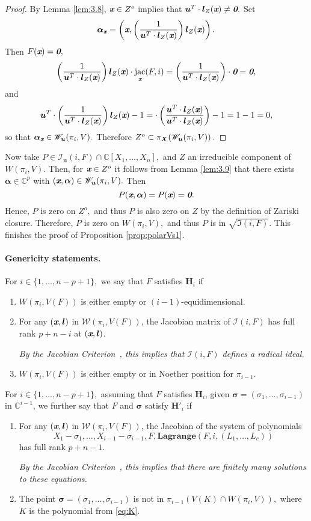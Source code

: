 \documentclass[a4paper]{article}
\def\bz{\textit{\textbf{0}}}
\def\Xb{\textit{\textbf{X}}}
\def\ub{{\bm u}}
\def\lb{{\bm l}}
\def\ax{\bm \alpha_{\xb}}
\def\xb{\textit{\textbf{x}}}
\DeclareMathOperator{\jac}{jac}
\def\C{\mathbb{C}}
\def\Wi{W(\pi_i,V)}
\def\Iir{\sqrt{\mathfrak{I}(i,F)}}
\def\ji{\jac_{\xb}(F,i)}
\def\lagF{{\bm{Lagrange}}(F,i,(L_1,\hdots,L_c))}
\def\Iil{\mathscr{I}_{\ub}(i,F)}
\def\Wil{\mathscr{W}_{\ub}(\pi_i,V)}
\begin{document}
%
\begin{proof}
By Lemma \ref{lem:3.8}, $\xb \in Z^o$ implies that $\ub^T \cdot \lb_{Z}(\xb) \not = \bz.$ Set
\[
\bm \alpha_{\xb} = \left(\xb,\left(\frac{1}{\ub^T\cdot \lb_{Z}(\xb)}\right)\lb_{Z}(\xb)\right). 
\]
Then $F(\xb)=\bz,$
\begin{align*}
    \left(\frac{1}{\ub^T\cdot \lb_{Z}(\xb)}\right)\lb_{Z}(\xb)\cdot \ji = \left(\frac{1}{\ub^T\cdot \lb_{Z}(\xb)}\right)\cdot \bz = \bz,
\end{align*}
and
\[
\ub^T\cdot\left(\frac{1}{\ub^T\cdot \lb_{Z}(\xb)}\right)\lb_{Z}(\xb)-1 =
    \cdot\left(\frac{\ub^T\cdot\lb_{Z}(\xb)}{\ub^T\cdot \lb_{Z}(\xb)}\right)-1=1-1=0,
\]
so that $\ax \in \Wil.$ Therefore $Z^o \subset \pi_{\Xb}\left(\Wil\right).$
%
\end{proof}
%
%
%
\noindent 
Now take $P \in \Iil\cap \C[X_1,\hdots,X_n],$ and $Z$ an irreducible component of $\Wi.$ Then, for $\xb \in Z^o$ it follows from Lemma \ref{lem:3.9} that there exists $\bm \alpha \in \C^p$ with $(\xb, \bm \alpha) \in \Wil.$ Then 
\[
P(\xb, \bm \alpha) = P(\xb) = \bz.
\]
Hence, $P$ is zero on $Z^o,$ and thus $P$ is also zero on $Z$ by the definition of Zariski closure. Therefore, $P$ is zero on $\Wi,$ and thus $P$ is in $\Iir.$ This finishes the proof of Proposition \ref{prop:polarVs1}. 

\noindent
\paragraph*{Genericity statements.}
For $i \in \{1,\hdots,n-p+1\},$ we say that $F$ satisfies $\textbf{H}_i$ if
%
%
\begin{enumerate}
\item  $W(\pi_i,V(F))$ is either empty or $(i-1)$-equidimensional.
\item For any $(\xb,\lb)$ in $\mathscr{W}(\pi_i,V(F))$, the Jacobian matrix of $\mathscr{I}(i,F)$ has full rank $p+n-i$ at $(\xb,\lb)$.  

{\em By the Jacobian Criterion~\cite[Corollary 16.20]{ECA}, this
  implies that $\mathscr{I}(i,F)$ defines a radical ideal.}
\item $W(\pi_i,V(F))$ is either empty or in Noether position for
  $\pi_{i-1}$.
\smallskip
\end{enumerate}
%
\noindent 
For $i \in \{1,\hdots,n-p+1\},$ assuming that $F$ satisfies $\bm H_i$, given $\bm \sigma = (\sigma_1,\hdots,\sigma_{i-1})$ 
in $\C^{i-1}$, we further say that $F$ and $\bm \sigma$ satisfy
$\textbf{H}'_i$ if
\begin{enumerate}
\item For any $(\xb,\lb)$ in $\mathscr{W}(\pi_i,V(F))$, the Jacobian of the system of polynomials  
\[
 X_1-\sigma_1,\dots,X_{i-1}-\sigma_{i-1},F, \lagF
\]
has full rank $p+n-1$. 

{\em By the Jacobian Criterion~\cite[Corollary 16.20]{ECA}, this implies that there are finitely many solutions to these equations.}

\item The point $\bm \sigma = (\sigma_1,\hdots,\sigma_{i-1})$ is not in $ \pi_{i-1} (V(K) \cap W(\pi_i,V)),$ where $K$ is the polynomial from \ref{eq:K}.

\end{enumerate}
\end{document}
